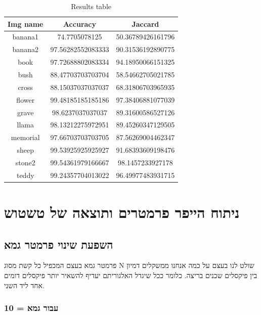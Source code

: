 \documentclass[a4paper,12pt]{article}
\begin{document}
\begin{table}[H]
\centering
\begin{tabular}{|c|c|c|}
\hline
\textbf{Img name} & \textbf{Accuracy} & \textbf{Jaccard} \\
\hline\hline
banana1 & 74.7705078125 & 50.36789426161796 \\
\hline
banana2 & 97.56282552083333 & 90.31536192890775 \\
\hline
book & 97.72688802083334 & 94.18950066151325 \\
\hline
bush & 88.47703703703704 & 58.54662705021785 \\
\hline
cross & 88.15037037037037 & 68.31806703965935 \\
\hline
flower & 99.48185185185186 & 97.38406881077039 \\
\hline
grave & 98.6237037037037 & 89.31600586527126 \\
\hline
llama & 98.13212275972951 & 89.45260347129505 \\
\hline
memorial & 97.66703703703705 & 87.56269004462347 \\
\hline
sheep & 99.53925925925927 & 91.68393609198476 \\
\hline
stone2 & 99.54361979166667 & 98.1457233927178 \\
\hline
teddy & 99.24357704013022 & 96.49977483931715 \\
\hline
\end{tabular}
\caption{Results table}
\label{tab:results}
\end{table}

\newpage
\section*{ניתוח הייפר פרמטרים ותוצאה של טשטוש}

\subsection*{השפעת שינוי פרמטר גמא}

פרמטר גמא בעצם המכפיל כל קשת מסוג N שולט לנו בעצם על כמה אנחנו ממשקלים דמיון בין פיקסלים שכנים בריצה. כלומר ככל שיגדל האלגוריתם יעדיף להשאיר יותר פיקסלים דומים אחד ליד השני.
\subsubsection*{עבור גמא = 10
}
\end{document}
